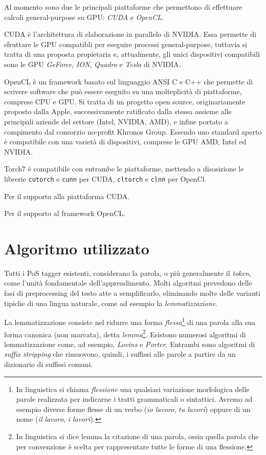 Al momento sono due le principali piattaforme che permettono di effettuare calcoli general-purpose su GPU: \emph{CUDA} e \emph{OpenCL}.

CUDA \`e l'architettura di elaborazione in parallelo di NVIDIA.
Essa permette di sfruttare le GPU compatibli per eseguire processi general-purpose, tuttavia si tratta di una proposta propietaria e, attualmente, gli unici dispositivi compatibili sono le GPU \emph{GeForce}, \emph{ION}, \emph{Quadro} e \emph{Tesla} di NVIDIA.

OpenCL \`e un framework basato sul linguaggio ANSI C e C++ che permette di scrivere software che pu\`o essere eseguito su una molteplicit\`a di piattaforme, comprese CPU e GPU.
Si tratta di un progetto open source, originariamente proposto dalla Apple, successivamente ratificato dalla stessa assieme alle principali aziende del settore (Intel, NVIDIA, AMD), e infine portato a compimento dal consorzio no-profit Khronos Group.
Essendo uno standard aperto \`e compatibile con una variet\`a di dispositivi, comprese le GPU AMD, Intel ed NVIDIA.

Torch7 \`e compatibile con entrambe le piattaforme, mettendo a disosizione le librerie \texttt{cutorch} e \texttt{cunn} per CUDA, \texttt{cltorch} e \texttt{clnn} per OpenCl.



Per il supporto alla piattaforma CUDA.



Per il supporto al framework OpenCL.

\section{Algoritmo utilizzato}

Tutti i PoS tagger esistenti, considerano la parola, o pi\`u generalmente il \emph{token}, come l'unit\`a fondamentale dell'apprendimento.
Molti algoritmi prevedono delle fasi di preprocessing del testo atte a semplificarlo, eliminando molte delle varianti tipiche di una lingua naturale, come ad esempio la \emph{lemmatizzazione}.

La lemmatizzazione consiste nel ridurre una forma \emph{flessa}\footnote{In linguistica si chiama \emph{flessione} una qualsiasi variazione morfologica delle parole realizzata per indicarne i tratti grammaticali o sintattici. Avremo ad esempio diverse forme flesse di un verbo (\emph{io lavoro}, \emph{tu lavori}) oppure di un nome (\emph{il lavoro}, \emph{i lavori}).} di una parola alla sua forma canonica (non marcata), detta \emph{lemma}\footnote{In linguistica si dice lemma la citazione di una parola, ossia quella parola che per convenzione è scelta per rappresentare tutte le forme di una flessione.}.
Esistono numerosi algoritmi di lemmatizzazione come, ad esempio, \emph{Lovins} e \emph{Porter}.
Entrambi sono algoritmi di \emph{suffix stripping} che rimuovono, quindi, i suffissi alle parole a partire da un dizionario di suffissi comuni.

